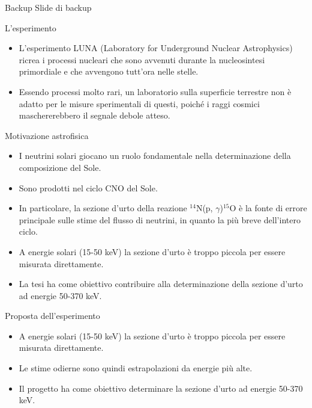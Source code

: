 \documentclass [xcolor=svgnames] {beamer}
\begin{document}
\begin{frame}{Backup}
	\centering
	Slide di backup
\end{frame}
	
\begin{frame}{L'esperimento}
	\begin{itemize}
		\item<1-> L'esperimento LUNA (Laboratory for Underground Nuclear Astrophysics) ricrea i processi nucleari che sono avvenuti durante la nucleosintesi primordiale e che avvengono tutt'ora nelle stelle.
		\item<2-> Essendo processi molto rari, un laboratorio sulla superficie terrestre non è adatto per le misure sperimentali di questi, poiché i raggi cosmici maschererebbero il segnale debole atteso.
	\end{itemize}
\end{frame}


\begin{frame}{Motivazione astrofisica}
	\begin{itemize}
		\item<1-> I neutrini solari giocano un ruolo fondamentale nella determinazione della composizione del Sole.
		\item<2-> Sono prodotti nel ciclo CNO del Sole.
		\item<3-> In particolare, la sezione d'urto della reazione $^{14}$N(p, $\gamma$)$^{15}$O è la fonte di errore principale sulle stime del flusso di neutrini, in quanto la più breve dell'intero ciclo.
		\item<4-> A energie solari (15-50 keV) la sezione d'urto è troppo piccola per essere misurata direttamente.
		\item<5-> La tesi ha come obiettivo contribuire alla determinazione della sezione d'urto ad energie 50-370 keV.
	\end{itemize}
\end{frame}
\begin{frame}{Proposta dell'esperimento}
	\begin{itemize}
		\item<1-> A energie solari (15-50 keV) la sezione d'urto è troppo piccola per essere misurata direttamente.
		\item<2-> Le stime odierne sono quindi estrapolazioni da energie più alte.
		\item<3-> Il progetto ha come obiettivo determinare la sezione d'urto ad energie 50-370 keV.
	\end{itemize}
\end{frame}
\end{document}
